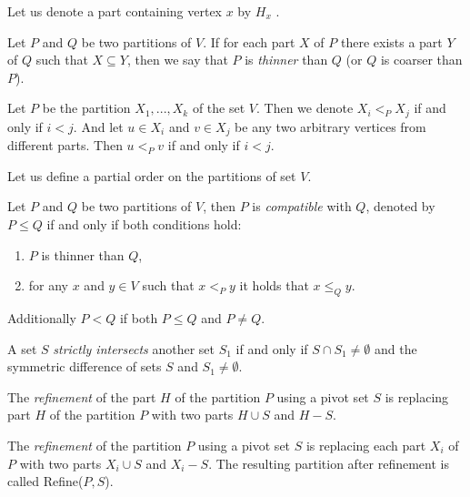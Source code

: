 Let us denote a part containing vertex $x$ by $H_x$ \cite{HABIB2005183}.
 
\begin{definition}
Let $P$ and $Q$ be two partitions of $V$. If for each part $X$ of $P$ there exists a part $Y$ of $Q$ such that $X \subseteq Y$, then we say that $P$ is \emph{thinner} than $Q$ (or $Q$ is coarser than $P$).
\end{definition}

\begin{notation}
 Let $P$ be the partition $X_1,...,X_k$ of the set $V$.
Then we denote $X_i <_P X_j$ if and only if  $i<j$. And let $u \in X_i$ and $v \in X_j$ be any two arbitrary vertices from different parts. Then $u <_P v$ if and only if $i<j$.
\end{notation}

Let us define a partial order on the partitions of set $V$.
\begin{definition} [Compatibility]
    Let $P$ and $Q$ be two partitions of $V$, then $P$ is \emph{compatible} with $Q$, denoted by $P \leq Q$ if and only if both conditions hold:
    \begin{enumerate}
        \item $P$ is thinner than $Q$,
        \item for any $x$ and $y \in V$ such that $x <_P y$ it holds that $x \leq_Q y$.
    \end{enumerate}
\end{definition}

Additionally $P<Q$ if both $P \leq Q$ and $P \neq Q$.

\begin{definition}
    A set $S$ \emph{strictly intersects} another set $S_1$ if and only if $S \cap S_1 \neq \emptyset$ and the symmetric difference of sets $S$ and $S_1 \neq \emptyset$.
\end{definition}

\begin{definition}
 The \emph{refinement} of the part $H$ of the partition $P$ using a pivot set $S$ is replacing  part $H$ of the partition $P$ with two parts $H \cup S$ and $H - S$. 
\end{definition}

\begin{definition}
 The \emph{refinement} of the partition $P$ using a pivot set $S$ is replacing each part $X_i$ of $P$ with two parts $X_i \cup S$ and $X_i - S$. The resulting partition after refinement is called Refine($P,S$).   
\end{definition}

